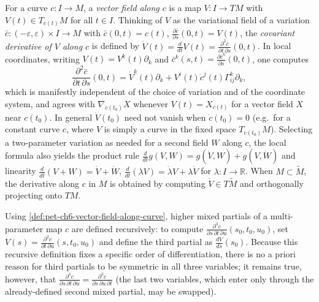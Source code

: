 \begin{definition}
  \label{def:pet-ch6-vector-field-along-curve}


  For a curve $c:I\to M$, a \emph{vector field along $c$} is a map $V:I\to TM$
  with $V(t)\in T_{c(t)}M$ for all $t\in I$. Thinking of $V$ as the variational
  field of a variation $\bar c:(-\varepsilon,\varepsilon)\times I\to M$ with
  $\bar c(0,t)=c(t)$, $\frac{\partial\bar c}{\partial s}(0,t)=V(t)$, the
  \emph{covariant derivative of $V$ along $c$} is defined by
  $\dot V(t)=\frac{d}{dt}V(t)=\frac{\partial^2\bar c}{\partial t\,\partial s}(0,t)$.
  In local coordinates, writing $V(t)=V^k(t)\partial_k$ and
  $\bar c^k(s,t)=\tfrac{\partial\bar c^k}{\partial s}(0,t)$, one computes
  \[
    \frac{\partial^2\bar c}{\partial t\,\partial s}(0,t)
    =\dot V^k(t)\partial_k+V^i(t)\dot c^j(t)\Gamma^k_{ij}\partial_k,
  \]
  which is manifestly independent of the choice of variation and of the
  coordinate system, and agrees with $\nabla_{\dot c(t_0)}X$ whenever
  $V(t)=X_{c(t)}$ for a vector field $X$ near $c(t_0)$. In general $\dot V(t_0)$
  need not vanish when $\dot c(t_0)=0$ (e.g.\ for a constant curve $c$, where $V$
  is simply a curve in the fixed space $T_{c(t_0)}M$). Selecting a two-parameter
  variation as needed for a second field $W$ along $c$, the local formula also
  yields the product rule $\frac{d}{dt}g(V,W)=g(\dot V,W)+g(V,\dot W)$ and
  linearity $\frac{d}{dt}(V+W)=\dot V+\dot W$,
  $\frac{d}{dt}(\lambda V)=\dot\lambda V+\lambda\dot V$ for $\lambda:I\to\mathbb{R}$.
  When $M\subset\tilde M$, the derivative along $c$ in $M$ is obtained by
  computing $\dot V\in T\tilde M$ and orthogonally projecting onto $TM$.
\end{definition}

\begin{definition}
  \label{def:pet-ch6-higher-order-partials}


  Using \cref{def:pet-ch6-vector-field-along-curve}, higher mixed partials of a
  multi-parameter map $c$ are defined recursively: to compute
  $\frac{\partial^3c}{\partial s\,\partial t\,\partial u}(s_0,t_0,u_0)$, set
  $V(s)=\frac{\partial^2c}{\partial t\,\partial u}(s,t_0,u_0)$ and define the
  third partial as $\frac{dV}{ds}(s_0)$. Because this recursive definition fixes
  a specific order of differentiation, there is no a priori reason for third
  partials to be symmetric in all three variables; it remains true, however,
  that $\frac{\partial^3c}{\partial s\,\partial t\,\partial u}
  =\frac{\partial^3c}{\partial s\,\partial u\,\partial t}$ (the last two
  variables, which enter only through the already-defined second mixed
  partial, may be swapped).
\end{definition}

